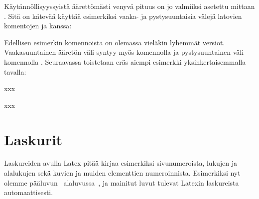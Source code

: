 Käytännöllisyyssyistä äärettömästi venyvä pituus 
on jo valmiiksi asetettu mittaan . Sitä on kätevää käyttää
esimerkiksi vaaka- ja pystysuuntaisia välejä latovien komentojen
 ja  kanssa:

\begin{koodilohkosis}
\hspace{\fill} %
\vspace{\fill} %
\end{koodilohkosis}

\noindent
Edellisen esimerkin komennoista on olemassa vieläkin lyhemmät versiot.
Vaakasuuntainen ääretön väli syntyy myös komennolla  ja
pystysuuntainen väli komennolla . Seuraavassa toistetaan
eräs aiempi esimerkki yksinkertaisemmalla tavalla:

\begin{koodilohkosis}
x\hfill x\hfill\hfill x
\end{koodilohkosis}

\begin{tulossis}
  x\hfill x\hfill\hfill x
\end{tulossis}

\section{Laskurit}
\label{luku/laskurit}

Laskureiden avulla Latex pitää kirjaa esimerkiksi sivunumeroista,
lukujen ja alalukujen sekä kuvien ja muiden elementtien numeroinnista.
Esimerkiksi nyt olemme pääluvun~
alaluvussa~, ja mainitut luvut tulevat Latexin
laskureista automaattisesti.



